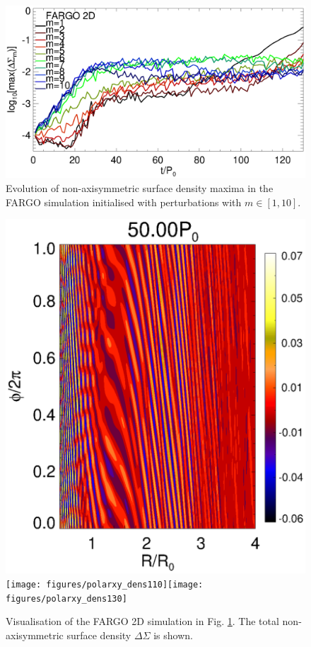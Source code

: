 \begin{figure}
  \includegraphics[width=\linewidth]{figures/nonaxi_evol_DZ_fargo}
  \caption{Evolution of non-axisymmetric surface density maxima 
    in the FARGO simulation initialised with perturbations
    with $m\in[1,10]$.\label{fargo_modeamp}} 
\end{figure}

\begin{figure}
  \includegraphics[scale=0.55]{figures/polarxy_dens050}\texttt{[image: figures/polarxy\_dens110]}\texttt{[image: figures/polarxy\_dens130]} 
  \caption{Visualisation of the FARGO 2D simulation in
    Fig. \ref{fargo_modeamp}. The total  
    non-axisymmetric surface density
    $\Delta\Sigma$ is shown. \label{fargo_2d}} 
\end{figure}

